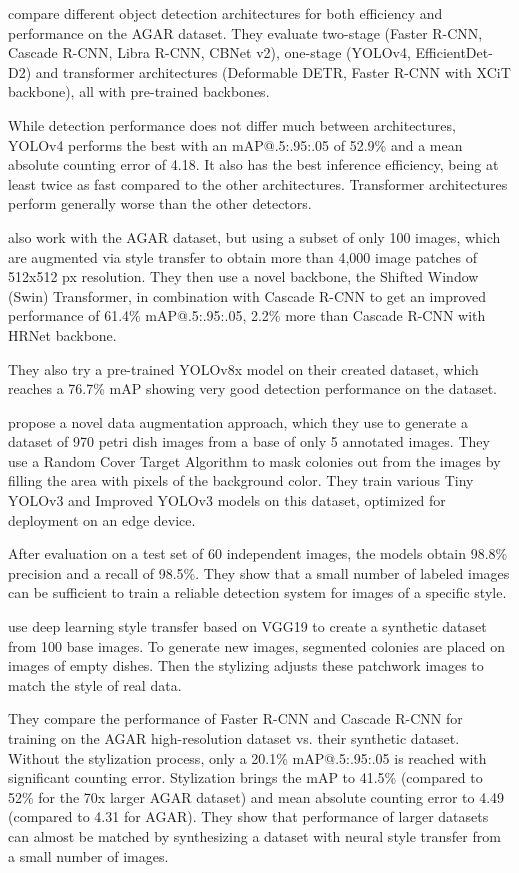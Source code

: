 \citet{Majchrowska_2022} compare different object detection architectures for both efficiency and performance on the AGAR dataset. They evaluate two-stage (Faster R-CNN, Cascade R-CNN, Libra R-CNN, CBNet v2), one-stage (YOLOv4, EfficientDet-D2) and transformer architectures (Deformable DETR, Faster R-CNN with XCiT backbone), all with pre-trained backbones. 

While detection performance does not differ much between architectures, YOLOv4 performs the best with an mAP@.5:.95:.05 of 52.9\% and a mean absolute counting error of 4.18. It also has the best inference efficiency, being at least twice as fast compared to the other architectures. Transformer architectures perform generally worse than the other detectors.

\citet{app131910568} also work with the AGAR dataset, but using a subset of only 100 images, which are augmented via style transfer to obtain more than 4,000 image patches of 512x512 px resolution. They then use a novel backbone, the Shifted Window (Swin) Transformer, in combination with Cascade R-CNN to get an improved performance of 61.4\% mAP@.5:.95:.05, 2.2\% more than Cascade R-CNN with HRNet backbone.

They also try a pre-trained YOLOv8x model on their created dataset, which reaches a 76.7\% mAP showing very good detection performance on the dataset.

\citet{biology11020156} propose a novel data augmentation approach, which they use to generate a dataset of 970 petri dish images from a base of only 5 annotated images. They use a Random Cover Target Algorithm to mask colonies out from the images by filling the area with pixels of the background color. They train various Tiny YOLOv3 and Improved YOLOv3 models on this dataset, optimized for deployment on an edge device.

After evaluation on a test set of 60 independent images, the models obtain 98.8\% precision and a recall of 98.5\%. They show that a small number of labeled images can be sufficient to train a reliable detection system for images of a specific style.

\citet{Pawowski2022Generation} use deep learning style transfer based on VGG19 to create a synthetic dataset from 100 base images. To generate new images, segmented colonies are placed on images of empty dishes. Then the stylizing adjusts these patchwork images to match the style of real data. 

They compare the performance of Faster R-CNN and Cascade R-CNN for training on the AGAR high-resolution dataset vs. their synthetic dataset. Without the stylization process, only a 20.1\% mAP@.5:.95:.05 is reached with significant counting error. Stylization brings the mAP to 41.5\% (compared to 52\% for the 70x larger AGAR dataset) and mean absolute counting error to 4.49 (compared to 4.31 for AGAR). They show that performance of larger datasets can almost be matched by synthesizing a dataset with neural style transfer from a small number of images.
